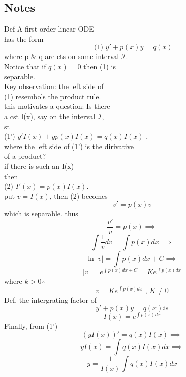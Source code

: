   \subsection*{ Notes \\ } 
  Def A first order linear ODE \\
  has the form
  \[ \text{ (1) } y' + p(x)y = q(x)\] 
  where p \& q are cts on some interval \( \mathcal{I}\). \\
  Notice that if \( q(x) = 0\) then (1) is \\	
  separable. \\	  
  Key observation: the left side of \\
  (1) resembols the product rule. \\
  this motivates a question: Is there \\
  a cst I(x), say on the interval \( \mathcal{I}\),  \\
  st  \\
  (1') \( y'I(x) + yp(x)I(x) = q(x)I(x)\) ,  \\
  where the left side of (1') is the dirivative  \\
  of a product? \\

  if there is such an I(x)  \\
  then  \\
  (2) \( I'(x) = p(x)I(x)\). \\
  put \( v = I(x)\), then (2) becomes  \\
  \[ v' = p(x)v\]
  which is separable. thus \nonumber\\
  \[ \frac{v'}{v} = p(x) \implies\]
  \[ \int \frac{1}{v}dv = \int p(x)dx \implies\]
  \[ \ln|v| = \int p(x)dx + C \implies \]
  \[ |v| = e^{\int p(x)dx + C} = Ke^{\int p(x)dx}\]
  where \( k > 0 \therefore\)
  \[ v = Ke^{\int p(x)dx} \text{ , } K \neq  0\]
  Def. the intergrating factor of 
  \[ y' + p(x)y = q(x) is \]
  \[ I(x) = e^{\int p(x) dx }\]
  Finally, from (1') 
  \[ (yI(x))' = q(x)I(x) \implies \]
  \[ yI(x) = \int q(x)I(x)dx \implies\] 
  \[ \boxed{ y = \frac{1}{I(x)} \int q(x)I(x)dx}\]
 
  \newpage
{}

